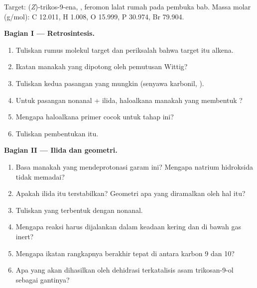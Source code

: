 \begin{problem}
\label{pb:b2:wittig:1}
Target: (\textit{Z})-trikos-9-ena, , feromon lalat
rumah pada pembuka bab. Massa molar (\unit{g/mol}): C 12.011, H 1.008,
O 15.999, P 30.974, Br 79.904.

\medskip
\noindent\textbf{Bagian I --- Retrosintesis.}
\begin{enumerate}
  \item Tuliskan rumus molekul target dan periksalah bahwa target itu alkena.
  \item Ikatan manakah yang dipotong oleh pemutusan Wittig?
  \item Tuliskan kedua pasangan yang mungkin (senyawa karbonil, ).
  \item Untuk pasangan nonanal + ilida, haloalkana manakah yang membentuk ?
  \item Mengapa haloalkana primer cocok untuk tahap ini?
  \item Tuliskan pembentukan  itu.
\end{enumerate}

\medskip
\noindent\textbf{Bagian II --- Ilida dan geometri.}
\begin{enumerate}[resume]
  \item Basa manakah yang mendeprotonasi garam ini? Mengapa natrium
        hidroksida tidak memadai?
  \item Apakah ilida itu terstabilkan? Geometri apa yang diramalkan oleh hal itu?
  \item Tuliskan  yang terbentuk dengan nonanal.
  \item Mengapa reaksi harus dijalankan dalam keadaan kering dan di bawah gas inert?
  \item Mengapa ikatan rangkapnya berakhir tepat di antara karbon 9 dan 10?
  \item Apa yang akan dihasilkan oleh dehidrasi terkatalisis asam
        trikosan-9-ol sebagai gantinya?
\end{enumerate}


\end{problem}
